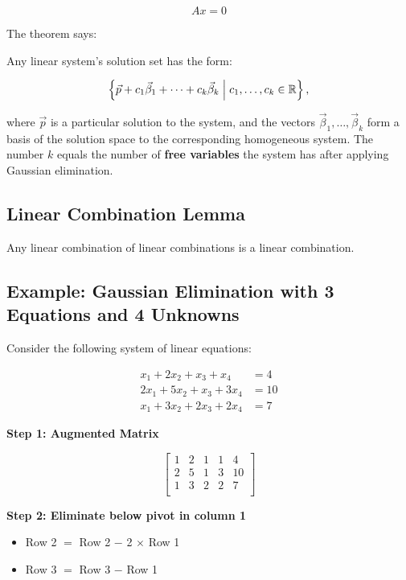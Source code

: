 \[
	A x = 0
\]

The theorem says:

Any linear system's solution set has the form:

\[
	\left\{ \vec{p} + c_1\vec{\beta}_1 + \cdots + c_k\vec{\beta}_k \;\middle|\; c_1, \ldots, c_k \in 
	\mathbb{R} \right\},
\]

where \(\vec{p}\) is a particular solution to the system, and the vectors \(\vec{\beta}_1, 
\ldots, \vec{\beta}_k\) form a basis of the solution space to the corresponding homogeneous system. 
The number \(k\) equals the number of \textbf{free variables} the system has after applying Gaussian 
elimination.

\subsection{Linear Combination Lemma}

Any linear combination of linear combinations is a linear combination.

\subsection{Example: Gaussian Elimination with 3 Equations and 4 Unknowns}

Consider the following system of linear equations:

\begin{align*}
	x_1 + 2x_2 + x_3 + x_4   & = 4  \\
	2x_1 + 5x_2 + x_3 + 3x_4 & = 10 \\
	x_1 + 3x_2 + 2x_3 + 2x_4 & = 7
\end{align*}

\textbf{Step 1: Augmented Matrix}

\[
	\begin{bmatrix}
		1 & 2 & 1 & 1 & 4  \\
		2 & 5 & 1 & 3 & 10 \\
		1 & 3 & 2 & 2 & 7  \\
	\end{bmatrix}
\]

\textbf{Step 2: Eliminate below pivot in column 1}

\begin{itemize}
	\item Row 2 \(=\) Row 2 \(-\) 2 \(\times\) Row 1
	\item Row 3 \(=\) Row 3 \(-\) Row 1
\end{itemize}

